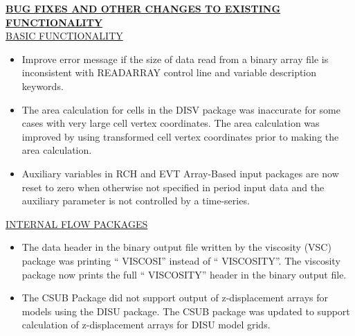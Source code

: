 	\textbf{\underline{BUG FIXES AND OTHER CHANGES TO EXISTING FUNCTIONALITY}} \\
	\underline{BASIC FUNCTIONALITY}
	\begin{itemize}
		\item Improve error message if the size of data read from a binary array file is inconsistent with READARRAY control line and variable description keywords.
		\item The area calculation for cells in the DISV package was inaccurate for some cases with very large cell vertex coordinates.  The area calculation was improved by using transformed cell vertex coordinates prior to making the area calculation.
		\item Auxiliary variables in RCH and EVT Array-Based input packages are now reset to zero when otherwise not specified in period input data and the auxiliary parameter is not controlled by a time-series.
	\end{itemize}

	\underline{INTERNAL FLOW PACKAGES}
	\begin{itemize}
		\item The data header in the binary output file written by the viscosity (VSC) package was printing `` VISCOSI'' instead of `` VISCOSITY''. The viscosity package now prints the full `` VISCOSITY'' header in the binary output file.
		\item The CSUB Package did not support output of z-displacement arrays for models using the DISU package.  The CSUB package was updated to support calculation of z-displacement arrays for DISU model grids.
	\end{itemize}


